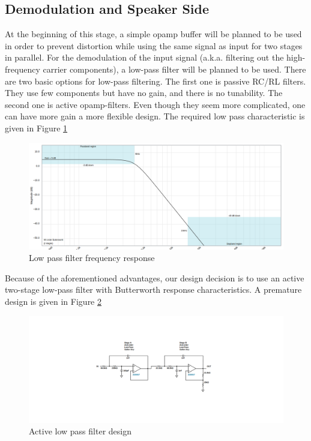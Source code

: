 \documentclass[a4paper,10pt]{IEEEtran}
\begin{document}
\subsection{Demodulation and Speaker Side}
At the beginning of this stage, a simple opamp buffer will be planned to be used in order to prevent distortion while using the same signal as input for two stages in parallel. For the demodulation of the input signal (a.k.a. filtering out the high-frequency carrier components), a low-pass filter will be planned to be used. There are two basic options for low-pass filtering. The first one is passive RC/RL filters. They use few components but have no gain, and there is no tunability. The second one is active opamp-filters. Even though they seem more complicated, one can have more gain a more flexible design. The required low pass characteristic is given in Figure \ref*{low_pass_plot}
\begin{figure}[htbp!]
    \centering
    \includegraphics[width = 0.75\linewidth]{active_low_pass.png}
    \caption{Low pass filter frequency response}
    \label{low_pass_plot}    
\end{figure} 
Because of the aforementioned advantages, our design decision is to use an active two-stage low-pass filter with Butterworth response characteristics. A premature design is given in Figure \ref*{low_pass_sch}
\begin{figure}[htbp!]
    \centering
    \includegraphics[width = 1\linewidth]{active_low_pass_circuit.png}
    \caption{Active low pass filter design}
    \label{low_pass_sch}    
\end{figure} 
\end{document}
